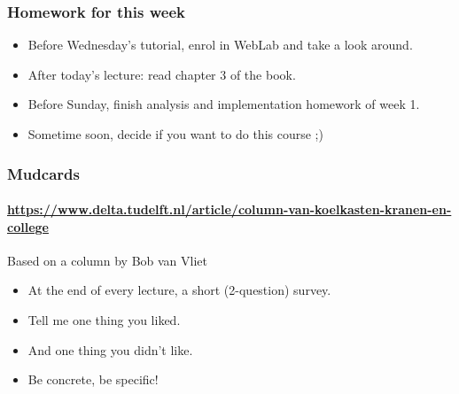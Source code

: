 
\begin{frame}
	\frametitle{Homework for this week}
	\begin{itemize}[<+->]
		\item \alert{Before} Wednesday's tutorial, enrol in WebLab and take a look around.
		\item \alert{After} today's lecture: read chapter 3 of the book.
		\item \alert{Before} Sunday, finish analysis and implementation homework of week 1.
		\item \alert{Sometime soon}, decide if you want to do this course ;)
	\end{itemize}
\end{frame}

\begin{frame}
	\frametitle{Mudcards}
	\framesubtitle{\url{https://www.delta.tudelft.nl/article/column-van-koelkasten-kranen-en-college}}
	
	\begin{block}{Based on a column by Bob van Vliet}
		\begin{itemize}
			\item At the end of every lecture, a short (2-question) survey.
				\pause
			\item Tell me one thing you liked.
			\item And one thing you didn't like.
				\pause
			\item Be concrete, be specific!
		\end{itemize}	
	\end{block}	
\end{frame}
